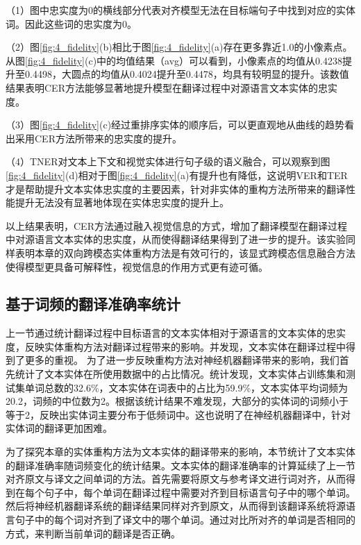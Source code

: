 （1）图中忠实度为0的横线部分代表对齐模型无法在目标端句子中找到对应的实体词。因此这些词的忠实度为0。

（2）图\ref{fig:4_fidelity}(b)相比于图\ref{fig:4_fidelity}(a)存在更多靠近1.0的小像素点。从图\ref{fig:4_fidelity}(c)中的均值结果（avg）可以看到，小像素点的均值从0.4238提升至0.4498，大圆点的均值从0.4024提升至0.4478，均具有较明显的提升。该数值结果表明CER方法能够显著地提升模型在翻译过程中对源语言文本实体的忠实度。

（3）图\ref{fig:4_fidelity}(c)经过重排序实体的顺序后，可以更直观地从曲线的趋势看出采用CER方法所带来的忠实度的提升。

（4）TNER对文本上下文和视觉实体进行句子级的语义融合，可以观察到图\ref{fig:4_fidelity}(d)相对于图\ref{fig:4_fidelity}(a)有提升也有降低，这说明VER和TER才是帮助提升文本实体忠实度的主要因素，针对非实体的重构方法所带来的翻译性能提升无法没有显著地体现在实体忠实度的提升上。

以上结果表明，CER方法通过融入视觉信息的方式，增加了翻译模型在翻译过程中对源语言文本实体的忠实度，从而使得翻译结果得到了进一步的提升。该实验同样表明本章的双向跨模态实体重构方法是有效可行的，该显式跨模态信息融合方法使得模型更具备可解释性，视觉信息的作用方式更有迹可循。

\subsection{基于词频的翻译准确率统计}
\label{sec:4_freq_acc}


上一节通过统计翻译过程中目标语言的文本实体相对于源语言的文本实体的忠实度，反映实体重构方法对翻译过程带来的影响。并发现，文本实体在翻译过程中得到了更多的重视。
为了进一步反映重构方法对神经机器翻译带来的影响，我们首先统计了文本实体在所使用数据中的占比情况。统计发现，文本实体占训练集和测试集单词总数的32.6\%，文本实体在词表中的占比为59.9\%，文本实体平均词频为20.2，词频的中位数为2。根据该统计结果不难发现，大部分的实体词的词频小于等于2，反映出实体词主要分布于低频词中。这也说明了在神经机器翻译中，针对实体词的翻译更加困难。

为了探究本章的实体重构方法为文本实体的翻译带来的影响，本节统计了文本实体的翻译准确率随词频变化的统计结果。文本实体的翻译准确率的计算延续了上一节对齐原文与译文之间单词的方法。首先需要将原文与参考译文进行词对齐，从而得到在每个句子中，每个单词在翻译过程中需要对齐到目标语言句子中的哪个单词。然后将神经机器翻译系统的翻译结果同样对齐到原文，从而得到该翻译系统将源语言句子中的每个词对齐到了译文中的哪个单词。通过对比所对齐的单词是否相同的方式，来判断当前单词的翻译是否正确。


